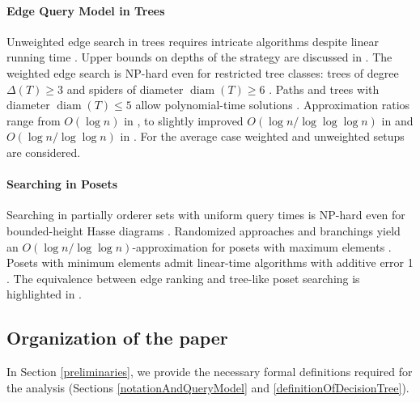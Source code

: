 \documentclass[a4paper, anonymous, numberwithinsect, pdfa, UKenglish,cleveref, autoref, thm-restate]{socg-lipics-v2021}
\newcommand{\br}[1]{\left( #1 \right)}
\newcommand{\diam}{\operatorname{diam}}
\begin{document}
\paragraph*{Edge Query Model in Trees}
Unweighted edge search in trees requires intricate algorithms despite linear running time \cite{Lam1998ERankOfGsIsH, Mozes_Onak2008FindOptTSStartInLinTime}. Upper bounds on depths of the strategy are discussed in \cite{LaberFastSInTs, MAKINOOnMinERankSTs, DereniowskiEfPQProcByGRank, Emamjomeh2016DetAndProbBSinGs}. The weighted edge search is NP-hard even for restricted tree classes: trees of degree $\Delta\br{T}\geq 3$ \cite{Cicalese2012BinIdentPForWTs} and spiders of diameter $\diam\br{T}\geq6$ \cite{Cicalese2016OnTSPwNonUniCost}. Paths and trees with diameter $\diam\br{T}\leq5$ allow polynomial-time solutions \cite{Cicalese2012BinIdentPForWTs}. Approximation ratios range from $O(\log n)$ in \cite{Dereniowski2009ERankOfWTs}, to slightly improved $O(\log n / \log \log \log n)$ in \cite{Cicalese2012BinIdentPForWTs} and  $O(\log n / \log \log n)$ in \cite{Cicalese2016OnTSPwNonUniCost}. For the average case weighted \cite{Cicalese2016DecTreesSimEval, Dasgupta} and unweighted setups \cite{Jacobs2010OnTheComplexSearchInTsAvg,Cicalese2014ImprovedApproxAvgTs, Hgemo2024TightAB} are considered. 

\paragraph*{Searching in Posets}
Searching in partially orderer sets with uniform query times is NP-hard even for bounded-height Hasse diagrams \cite{CarmoSInRandPOSets, DereniowskiERAndSInPOSets}. Randomized approaches and branchings yield an $O(\log n / \log \log n)$-approximation for posets with maximum elements \cite{DereniowskiERAndSInPOSets}. Posets with minimum elements admit linear-time algorithms with additive error 1 \cite{OnakParys2006GenOfBSSInTsAndFLikePosets}. The equivalence between edge ranking and tree-like poset searching is highlighted in \cite{DereniowskiERAndSInPOSets}.

\subsection{Organization of the paper}
In Section \ref{preliminaries}, we provide the necessary formal definitions required for the analysis (Sections \ref{notationAndQueryModel} and \ref{definitionOfDecisionTree}).
\end{document}
